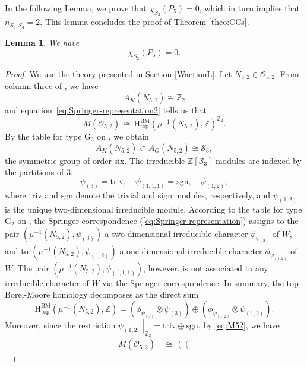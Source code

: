 \documentclass[a4paper, 11pt]{article}
\newtheorem{lem}[theo]{Lemma}
\begin{document}
In the following Lemma, we prove that $\chi_{S_{2}}^{}(P_5)=0$, which
in turn implies that $n_{S_5,S_4}=2$. 
This lemma concludes the proof of Theorem \ref{theo:CCs}. 
\begin{lem}\label{lem=chiS5}
We have
$$
\chi_{S_{2}}^{}(P_5)=0.
$$
\end{lem}
\begin{proof}
We use the theory presented in Section \ref{WactionL}.  Let $N_{5,2}
\in \mathcal{O}_{5,2}$. From 
column three of \cite[Table~1]{Samples}, we have
\[
A_K(N_{5,2}) \cong \mathbb{Z}_2
\]
and equation~\eqref{eq:Springer-representation2} tells us that
\begin{equation}\label{eq:M52}
M(\mathcal{O}_{5,2}) \, \cong\,
\mathrm{H}_{\mathrm{top}}^{\mathrm{BM}}(\mu^{-1}(N_{5,2}), \mathbb{Z})^{\mathbb{Z}_2}. 
\end{equation}
By the table for type \( \mathrm{G}_{2} \) on
\cite[page 427]{Carter85}, we obtain $$A_K(N_{5,2}) \subset
A_G(N_{5,2}) \cong  \mathcal{S}_3,$$
the symmetric group of order six.   
The irreducible \(\mathbb{Z}[
\mathcal{S}_3] \)-modules are indexed by the partitions of 3:  
\[
\psi_{(3)} = \mathrm{triv}, \quad 
\psi_{(1,1,1)} = \mathrm{sgn}, \quad 
\psi_{(1,2)},
\]
where \( \mathrm{triv} \) and \( \mathrm{sgn} \) denote the trivial
and sign modules, respectively, and \( \psi_{(1,2)} \) is the
unique two-dimensional irreducible module. 
According to the table for type \( \mathrm{G}_{2} \) on \cite[page
  427]{Carter85}, the Springer correspondence
(\ref{eq:Springer-representation}) assigns to the pair \( 
\left( \mu^{-1}(N_{5,2}), \psi_{(3)} \right) \) a two-dimensional
irreducible character \( \phi_{\psi_{(3)}} \) of \( W \), and to \(
\left( \mu^{-1}(N_{5,2}), \psi_{(1,2)} \right) \) a one-dimensional
irreducible character \( \phi_{\psi_{(1,2)}} \) of \( W \). The pair
\( \left( \mu^{-1}(N_{5,2}), \psi_{(1,1,1)} \right) \), however, is
not associated to any irreducible character of \( W \) via the
Springer correspondence. In summary,  the top Borel-Moore homology  
decomposes as the direct sum
$$
\mathrm{H}_{\mathrm{top}}^{\mathrm{BM}}(\mu^{-1}(N_{5,2}), \mathbb{Z})=
\left( \phi_{\psi_{(3)}}\otimes {\psi_{(3)}} \right) \oplus \left(
\phi_{\psi_{(1,2)}}\otimes {\psi_{(1,2)}} \right).
$$
Moreover, since the restriction
$\left.\psi_{(1,2)}\right|_{\mathbb{Z}_2}^{}=\mathrm{triv}\oplus\mathrm{sgn}$, 
by \eqref{eq:M52}, we have 
\begin{align}\label{eq:isoV1}
M(\mathcal{O}_{5,2})\, &\cong\,  \left( \left( 

\end{align}
\end{proof}
\end{document}
